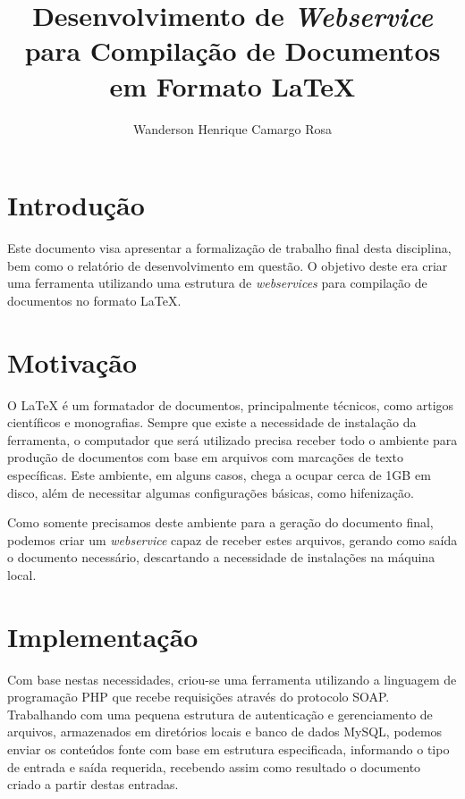 \documentclass{article}
\title{Desenvolvimento de \emph{Webservice} para Compilação de Documentos em
Formato \LaTeX{}}
\author{Wanderson Henrique Camargo Rosa\inst{1}}
\begin{document}
\maketitle{}

\section{Introdução}

Este documento visa apresentar a formalização de trabalho final desta
disciplina, bem como o relatório de desenvolvimento em questão. O objetivo deste
era criar uma ferramenta utilizando uma estrutura de \emph{webservices} para
compilação de documentos no formato \LaTeX{}.

\section{Motivação}

O \LaTeX{} é um formatador de documentos, principalmente técnicos, como artigos
científicos e monografias. Sempre que existe a necessidade de instalação da
ferramenta, o computador que será utilizado precisa receber todo o ambiente para
produção de documentos com base em arquivos com marcações de texto específicas.
Este ambiente, em alguns casos, chega a ocupar cerca de 1GB em disco, além de
necessitar algumas configurações básicas, como hifenização.

Como somente precisamos deste ambiente para a geração do documento final,
podemos criar um \emph{webservice} capaz de receber estes arquivos, gerando como
saída o documento necessário, descartando a necessidade de instalações na
máquina local.

\section{Implementação}

Com base nestas necessidades, criou-se uma ferramenta utilizando a linguagem de
programação PHP que recebe requisições através do protocolo SOAP. Trabalhando
com uma pequena estrutura de autenticação e gerenciamento de arquivos,
armazenados em diretórios locais e banco de dados MySQL, podemos enviar os
conteúdos fonte com base em estrutura especificada, informando o tipo de entrada
e saída requerida, recebendo assim como resultado o documento criado a partir
destas entradas.
\end{document}
